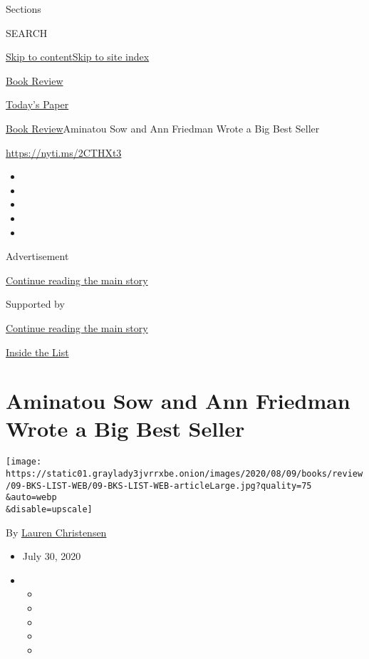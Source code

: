 Sections

SEARCH

\protect\hyperlink{site-content}{Skip to
content}\protect\hyperlink{site-index}{Skip to site index}

\href{https://www.nytimes3xbfgragh.onion/section/books/review}{Book
Review}

\href{https://myaccount.nytimes3xbfgragh.onion/auth/login?response_type=cookie\&client_id=vi}{}

\href{https://www.nytimes3xbfgragh.onion/section/todayspaper}{Today's
Paper}

\href{/section/books/review}{Book Review}\textbar{}Aminatou Sow and Ann
Friedman Wrote a Big Best Seller

\url{https://nyti.ms/2CTHXt3}

\begin{itemize}
\item
\item
\item
\item
\item
\end{itemize}

Advertisement

\protect\hyperlink{after-top}{Continue reading the main story}

Supported by

\protect\hyperlink{after-sponsor}{Continue reading the main story}

\href{/column/inside-the-list}{Inside the List}

\hypertarget{aminatou-sow-and-ann-friedman-wrote-a-big-best-seller}{%
\section{Aminatou Sow and Ann Friedman Wrote a Big Best
Seller}\label{aminatou-sow-and-ann-friedman-wrote-a-big-best-seller}}

\texttt{[image: https://static01.graylady3jvrrxbe.onion/images/2020/08/09/books/review/09-BKS-LIST-WEB/09-BKS-LIST-WEB-articleLarge.jpg?quality=75\\\&auto=webp\\\&disable=upscale]}

By
\href{https://www.nytimes3xbfgragh.onion/by/lauren-christensen}{Lauren
Christensen}

\begin{itemize}
\item
  July 30, 2020
\item
  \begin{itemize}
  \item
  \item
  \item
  \item
  \item
  \end{itemize}
\end{itemize}

